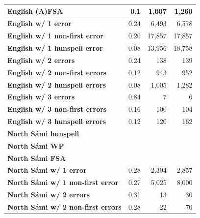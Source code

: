 \documentclass[a4paper,12pt]{article}
\begin{document}
\begin{table}
\begin{tabular}{|l|r|r|r|}
          \bf English (A)FSA & 0.1 & 1,007 & 1,260 \\
        \hline
        \bf English w/ 1 error     & 0.24  & 6,493  & 6,578 \\
 \bf English w/ 1 non-first error  & 0.20  & 17,857 & 17,857  \\
 \bf English w/ 1 hunspell error   & 0.08  & 13,956 & 18,758  \\
     \bf English w/ 2 errors       & 0.24  & 138    & 139  \\
 \bf English w/ 2 non-first errors & 0.12  & 943    & 952 \\
 \bf English w/ 2 hunspell errors  & 0.08  & 1,005  & 1,282 \\
   \bf English w/ 3 errors         & 0.84  & 7      & 6    \\
 \bf English w/ 3 non-first errors & 0.16  & 100    & 104  \\
 \bf English w/ 3 hunspell errors  & 0.12  & 120    & 162  \\
        \hline
   \bf North Sámi hunspell & & & \\
        \bf North Sámi WP  & & & \\
        \bf North Sámi FSA & & & \\
        \hline
        \bf North Sámi w/ 1 error    & 0.28 & 2,304 & 2,857 \\
\bf North Sámi w/ 1 non-first error  & 0.27 & 5,025 & 8,000 \\
       \bf North Sámi w/ 2 errors    & 0.31 & 13    & 30    \\
\bf North Sámi w/ 2 non-first errors & 0.28 & 22    & 70    \\

\end{tabular}
\end{table}
\end{document}
